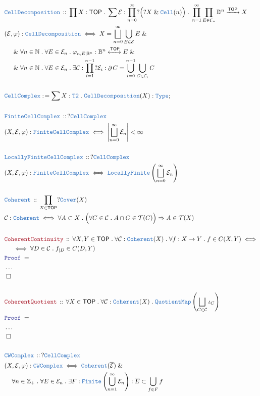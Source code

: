 \documentclass[12pt]{scrartcl}
\newcommand{\TYPE}[1]{\textcolor{NavyBlue}{\mathtt{#1}}}
\newcommand{\LOGIC}[1]{\textcolor{Blue}{\mathtt{#1}}}
\newcommand{\THM}[1]{\textcolor{Maroon}{\mathtt{#1}}}
\renewcommand{\.}{\; . \;}
\newcommand{\de}{: \kern 0.1pc =}
\newcommand{\Theorem}[2]{& \THM{#1} \, :: \, #2 \\ & \Proof = \\ }
\newcommand{\DeclareType}[2]{& \TYPE{#1} \, :: \, #2 \\}
\newcommand{\DefineType}[3]{& #1 : \TYPE{#2} \iff #3 \\}
\newcommand{\NewLine}{\\ & \kern 1pc}
\newcommand{\Page}[1]{ \begin{align*} #1 \end{align*}   }
\newcommand{\NoProof}{ & \ldots \\ \EndProof}
\renewcommand{\And}{\; \& \;}
\newcommand{\Imply}{\Rightarrow}
\newcommand{\Type}{\TYPE{Type}}
\newcommand{\Int}{\mathbb{Z} }
\newcommand{\Nat}{\mathbb{N} }
\newcommand{\ToIso}{\xleftrightarrow}
\newcommand{\Arrow}{\xrightarrow}
\newcommand{\Conclude}[3]{& #1 \de #2 : #3; \\}
\newcommand{\QED}{\; \square}
\newcommand{\EndProof}{& \QED \\}
\newcommand{\Proof}{\LOGIC{Proof} \; }
\newcommand{\C}{\mathcal{C}}
\DeclareMathOperator*{\boundary}{\partial}
\newcommand{\TOP}{\mathsf{TOP}}
\newcommand{\T}{\mathcal{T}}
\newcommand{\E}{\mathcal{E}}
\begin{document}
\Page{
	\DeclareType{CellDecomposition}
	{
		\prod X : \TOP \. 
		\sum \mathcal{E} : \prod^\infty_{n=0} ?\Big(?X \And \TYPE{Cell}(n) \Big) \.
		\prod^\infty_{n=1} \prod_{E \in \mathcal{E}_n} \mathbb{D}^n \Arrow{\TOP} X
	}
	\DefineType{(\mathcal{E},\varphi)}{CellDecomposition}
	{
			X = \bigsqcup^\infty_{n=0} \bigcup_{E \in \mathcal{E}} E 
		\And \NewLine \And
			\forall n \in \Nat \. 
			\forall E \in \mathcal{E}_n \. 
			\varphi_{n,E|\mathbb{B}^n} : \mathbb{B}^n \ToIso{\TOP} E 
		\And \NewLine \And
			\forall n \in \Nat \. 
			\forall E \in \mathcal{E}_n \. 
			\exists \C : \prod^{n-1}_{i=1} ? \mathcal{E}_i : 
			\boundary C = \bigcup_{i=0}^{n-1} \bigcup_{C \in \C_i } C
	}
	\\
	\Conclude{\TYPE{CellComplex}}{\sum X : \TYPE{T2} \. \TYPE{CellDecomposition}(X)}{\Type}
	\\
	\DeclareType{FiniteCellComplex}{?\TYPE{CellComplex}}
	\DefineType{(X,\E,\varphi)}{\TYPE{FiniteCellComplex}}{\left| \bigsqcup^\infty_{n=0} \E_n \right| < \infty}
	\\
	\DeclareType{LocallyFiniteCellComplex}{?\TYPE{CellComplex}}
	\DefineType{(X,\E,\varphi)}{\TYPE{FiniteCellComplex}}{\TYPE{LocallyFinite}\left( \bigsqcup^\infty_{n=0} \E_n \right)}
	\\
	\DeclareType{Coherent}{\prod_{X \in \TOP} ?\TYPE{Cover}(X)}
	\DefineType{\C}{Coherent}{
		\forall A \subset X \. 
		\Big( \forall C \in \C \. A \cap C \in \T(C) \Big)
		\Imply
		A \in \T(X) 
	}
	\\
	\Theorem{CoherentContinuity}{ 
		\forall X,Y \in \TOP \.
		\forall \C : \TYPE{Coherent}(X) \.
		\forall f : X \to Y \.
		f \in C(X,Y) 
		\iff \NewLine \iff
		\forall D \in \C \.
		f_{|D} \in C(D,Y) 
	}
	\NoProof
	\\
	\Theorem{CoherentQuotient}{ 
		\forall X \in \TOP \.
		\forall \C : \TYPE{Coherent}(X) \.
		\TYPE{QuotientMap}\left(\bigsqcup_{C \in \C} \iota_{C}\right)
	}
	\NoProof
	\\
	\DeclareType{CWComplex}
	{
		?\TYPE{CellComplex} 
	}
	\DefineType{(X,\E,\varphi)}{\TYPE{CWComplex}}
	{
		\TYPE{Coherent}(\overline{\E}) \And \NewLine
		\forall n \in \Int_+ \. 
		\forall E \in \E_n \.
		\exists F : \TYPE{Finite}\left( \bigcup^\infty_{n=1} \E_n \right) :
		\overline{E} \subset \bigcup_{f \in F} f
	}
}
\end{document}
